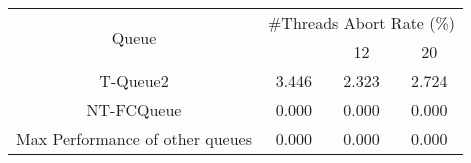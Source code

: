 \begin{tabular}{|c|c|c|c|}
\hline
\multirow{2}{*}{Queue} & \multicolumn{3}{c|}{\#Threads Abort Rate (\%)}\\\cline{2-4}& \quad 4 & 12 & 20\\
\hline
\hline
T-Queue2 & 3.446 & 2.323 & 2.724\\
NT-FCQueue & 0.000 & 0.000 & 0.000\\
Max Performance of other queues & 0.000 & 0.000 & 0.000\\
\hline\end{tabular}
